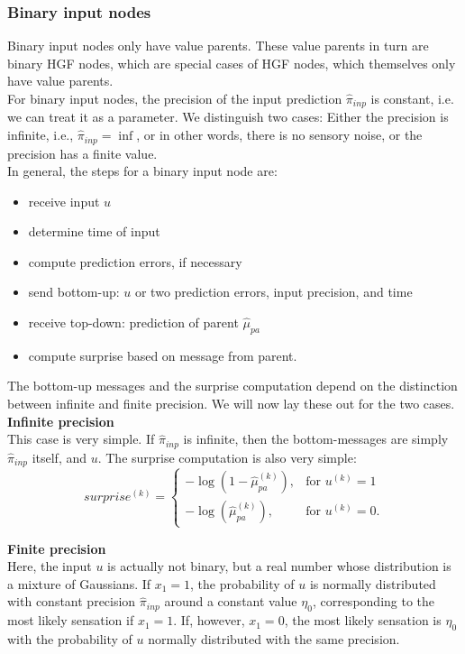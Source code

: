 \subsubsection{Binary input nodes}
Binary input nodes only have value parents. These value parents in turn are binary HGF nodes, which are special cases of HGF nodes, which themselves only have value parents.\\

For binary input nodes, the precision of the input prediction $\hat{\pi}_{inp}$ is constant, i.e. we can treat it as a parameter. We distinguish two cases: Either the precision is infinite, i.e., $\hat{\pi}_{inp} = \inf$, or in other words, there is no sensory noise, or the precision has a finite value.\\

In general, the steps for a binary input node are:
\begin{itemize}
    \item receive input $u$
    \item determine time of input
    \item compute prediction errors, if necessary
    \item send bottom-up: $u$ or two prediction errors, input precision, and time
    \item receive top-down: prediction of parent $\hat{\mu}_{pa}$
    \item compute surprise based on message from parent.
\end{itemize}

The bottom-up messages and the surprise computation depend on the distinction between infinite and finite precision. We will now lay these out for the two cases.\\

\noindent
\textbf{Infinite precision}\\
\noindent
This case is very simple. If $\hat{\pi}_{inp}$ is infinite, then the bottom-messages are simply $\hat{\pi}_{inp}$ itself, and $u$. The surprise computation is also very simple:
\begin{equation}
    surprise^{(k)} = \left.
    \begin{cases}
        -\log(1-\hat{\mu}_{pa}^{(k)}), & \text{for } u^{(k)} = 1\\
        -\log(\hat{\mu}_{pa}^{(k)}), & \text{for } u^{(k)} = 0.
    \end{cases}
    \right.
\end{equation}


\noindent
\textbf{Finite precision}\\
\noindent
Here, the input $u$ is actually not binary, but a real number whose distribution is a mixture of Gaussians. If $x_1 = 1$, the probability of $u$ is normally distributed with constant precision $\hat{\pi}_{inp}$ around a constant value $\eta_0$, corresponding to the most likely sensation if $x_1 = 1$. If, however, $x_1 = 0$, the most likely sensation is $\eta_0$ with the probability of $u$ normally distributed with the same precision.\\


